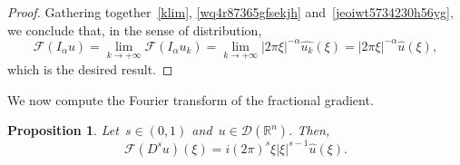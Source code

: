 \documentclass[11pt,hyp,]{nyjm}
\numberwithin{equation}{section}
\newcommand{\R}{\mathbb{R}}
\newtheorem{proposition}[theorem]{Proposition}
\theoremstyle{remark}
\begin{document}
\begin{proof}
Gathering together~\eqref{klim}, \eqref{wq4r87365gfsekjh} and~\eqref{jeoiwt5734230h56yg}, we conclude that, in the sense of distribution,
\begin{equation*}
\mathcal{F}(I_{\alpha} u)= \lim_{k \to +\infty} \mathcal{F}(I_{\alpha} u_k) 
=  \lim_{k \to +\infty} | 2 \pi \xi|^{-\alpha} \widehat{u_k} (\xi)
= | 2 \pi \xi|^{-\alpha} \widehat{u} (\xi),
\end{equation*}
which is the desired result.
\end{proof}
			
We now compute the Fourier transform of the fractional gradient.

			\begin{proposition}\label{huy}
				Let~$s \in (0,1)$ and~$u \in \mathcal{D}(\R^n)$. Then,
				\begin{equation}\label{four}
					\mathcal{F}(D^s u)(\xi)= i (2 \pi)^s \xi |\xi|^{s-1} \widehat{u}(\xi).
				\end{equation}
			\end{proposition}
			
\end{document}
